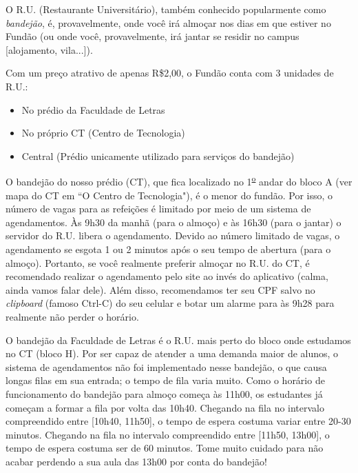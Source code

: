     O R.U. (Restaurante Universitário), também conhecido popularmente como \textit{bandejão}, é, provavelmente, onde você irá almoçar nos dias em que estiver no Fundão (ou onde você, provavelmente, irá jantar se residir no campus [alojamento, vila...]).
    
    Com um preço atrativo de apenas R\$2,00, o Fundão conta com 3 unidades de R.U.:
	\begin{itemize}
    	\item No prédio da Faculdade de Letras
        \item No próprio CT (Centro de Tecnologia)
        \item Central (Prédio unicamente utilizado para serviços do bandejão)
    \end{itemize}
    
    O bandejão do nosso prédio (CT), que fica localizado no 1\textsuperscript{\underline{o}} andar do bloco A (ver mapa do CT em ``O Centro de Tecnologia"), é o menor do fundão. Por isso, o número de vagas para as refeições é limitado por meio de um sistema de agendamentos. Às 9h30 da manhã (para o almoço) e às 16h30 (para o jantar) o servidor do R.U. libera o agendamento. Devido ao número limitado de vagas, o agendamento se esgota 1 ou 2 minutos após o seu tempo de abertura (para o almoço). Portanto, se você realmente preferir almoçar no R.U. do CT, é recomendado realizar o agendamento pelo site ao invés do aplicativo (calma, ainda vamos falar dele). Além disso, recomendamos ter seu CPF salvo no \textit{clipboard} (famoso Ctrl-C) do seu celular e botar um alarme para às 9h28 para realmente não perder o horário.
    
    O bandejão da Faculdade de Letras é o R.U. mais perto do bloco onde estudamos no CT (bloco H). Por ser capaz de atender a uma demanda maior de alunos, o sistema de agendamentos não foi implementado nesse bandejão, o que causa longas filas em sua entrada; o tempo de fila varia muito. Como o horário de funcionamento do bandejão para almoço começa às 11h00, os estudantes já começam a formar a fila por volta das 10h40. Chegando na fila no intervalo compreendido entre [10h40, 11h50], o tempo de espera costuma variar entre 20-30 minutos. Chegando na fila no intervalo compreendido entre [11h50, 13h00], o tempo de espera costuma ser de 60 minutos. Tome muito cuidado para não acabar perdendo a sua aula das 13h00 por conta do bandejão!
    
